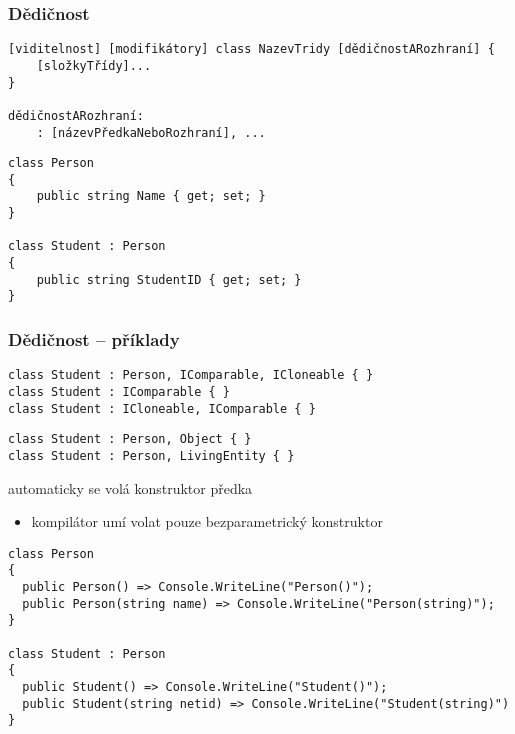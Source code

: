 \begin{frame}[fragile]
\frametitle{Dědičnost}
\begin{noteblock}{}
\begin{lstlisting}[basicstyle=\small]
[viditelnost] [modifikátory] class NazevTridy [dědičnostARozhraní] { 
	[složkyTřídy]...
}

dědičnostARozhraní:
	: [názevPředkaNeboRozhraní], ...
\end{lstlisting}
\end{noteblock}
\vfill
\begin{yesblock}
\begin{lstlisting}[basicstyle=\small]
class Person
{
    public string Name { get; set; }
}

class Student : Person
{
    public string StudentID { get; set; }
}
\end{lstlisting}
\end{yesblock}
\end{frame}



\begin{frame}[fragile]
\frametitle{Dědičnost -- příklady}
\begin{yesblock}
\begin{lstlisting}[basicstyle=\small]
class Student : Person, IComparable, ICloneable { }
class Student : IComparable { }
class Student : ICloneable, IComparable { }
\end{lstlisting}
\end{yesblock}
\vfill
\begin{noblock}
\begin{lstlisting}[basicstyle=\small]
class Student : Person, Object { }
class Student : Person, LivingEntity { }
\end{lstlisting}
\end{noblock}
\end{frame}



\begin{frame}[fragile]
\begin{bitemize}{}
\item automaticky se volá konstruktor předka
\begin{itemize}
\item kompilátor umí volat pouze bezparametrický konstruktor
\end{itemize}
\end{bitemize}

\begin{yesblock}
\begin{lstlisting}[basicstyle=\small]
class Person
{
  public Person() => Console.WriteLine("Person()");
  public Person(string name) => Console.WriteLine("Person(string)");
}

class Student : Person
{
  public Student() => Console.WriteLine("Student()");
  public Student(string netid) => Console.WriteLine("Student(string)")
}
\end{lstlisting}
\end{yesblock}
\end{frame}


